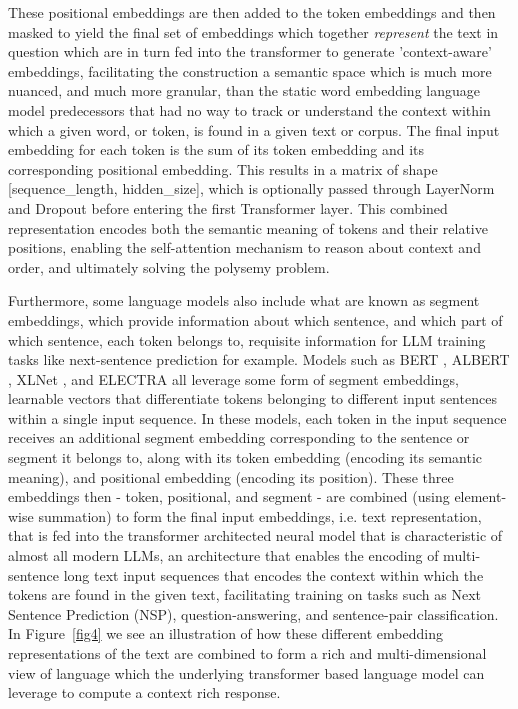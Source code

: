 \documentclass[final]{clv2025-revised}
\begin{document}
These positional embeddings are then added to the token embeddings and then masked to yield the final set of embeddings which together \textit{represent} the text in question which are in turn fed into the transformer to generate 'context-aware' embeddings, facilitating the construction a semantic space which is much more nuanced, and much more granular, than the static word embedding language model predecessors that had no way to track or understand the context within which a given word, or token, is found in a given text or corpus. The final input embedding for each token is the sum of its token embedding and its corresponding positional embedding. This results in a matrix of shape [sequence\_length, hidden\_size], which is optionally passed through LayerNorm and Dropout before entering the first Transformer layer. This combined representation encodes both the semantic meaning of tokens and their relative positions, enabling the self-attention mechanism to reason about context and order, and ultimately solving the polysemy problem.

Furthermore, some language models also include what are known as segment embeddings, which provide information about which sentence, and which part of which sentence, each token belongs to, requisite information for LLM training tasks like next-sentence prediction for example. Models such as BERT \cite{devlin-etal-2019-bert}, ALBERT \cite{lan2019albert}, XLNet \cite{yang2019xlnet}, and ELECTRA \cite{clark2020electra} all leverage some form of segment embeddings, learnable vectors that differentiate tokens belonging to different input sentences within a single input sequence. In these models, each token in the input sequence receives an additional segment embedding corresponding to the sentence or segment it belongs to, along with its token embedding (encoding its semantic meaning), and positional embedding (encoding its position). These three embeddings then - token, positional, and segment - are combined (using element-wise summation) to form the final input embeddings, i.e. text representation, that is fed into the transformer architected neural model that is characteristic of almost all modern LLMs, an architecture that enables the encoding of multi-sentence long text input sequences that encodes the context within which the tokens are found in the given text, facilitating training on tasks such as Next Sentence Prediction (NSP), question-answering, and sentence-pair classification. In Figure~\ref{fig4} we see an illustration of how these different embedding representations of the text are combined to form a rich and multi-dimensional view of language which the underlying transformer based language model can leverage to compute a context rich response. 
\end{document}

